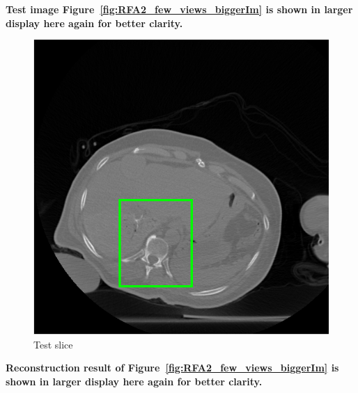 \documentclass{article}
\begin{document}
\textbf{Test image Figure~\ref{fig:RFA2_few_views_biggerIm}  is shown in larger display here  again for better clarity.}\\
\begin{figure}[!h]
\centering
\includegraphics[width=1.2\columnwidth]{../images/tmh/RFA2/few_views/colorTestIm.png}
\captionsetup{labelformat=empty}
\caption[Representative results-2]{\large{Test slice}}
\label{fig:RFA2_few_views_bigger}
\end{figure}
\newpage
\textbf{Reconstruction result of Figure~\ref{fig:RFA2_few_views_biggerIm}  is shown in larger display here  again for better clarity.}\\
\end{document}

